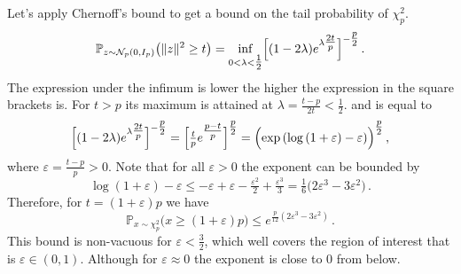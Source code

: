 \documentclass[a4paper,10pt]{article}
\begin{document}
Let's apply Chernoff's bound to get a bound on the tail probability of $\chi^2_p$.
\begin{equation*}
  \mathbb{P}_{z \sim \mathcal{N}_p(0, I_p)}\bigl( \|z\|^2 \geq t \bigr)
    = \inf_{0 < \lambda < \tfrac12} \Bigl[(1 - 2\lambda) e^{\lambda \tfrac{2 t}{p}} \Bigr]^{-\tfrac{p}2}
    \,.
\end{equation*}
The expression under the infimum is lower the higher the expression in the square
brackets is. For $t > p$ its maximum is attained at $\lambda = \tfrac{t - p}{2 t} < \tfrac12$.
and is equal to
$$
  \Bigl[(1 - 2\lambda) e^{\lambda \tfrac{2 t}{p}} \Bigr]^{-\tfrac{p}2}
    = \Bigl[\tfrac{t}{p} e^{\tfrac{p - t}{p}} \Bigr]^{\tfrac{p}2}
    = \Bigl( \exp{(\log{(1 + \varepsilon)} - \varepsilon)} \Bigr)^{\tfrac{p}2}
    \,, $$
where $\varepsilon = \tfrac{t-p}{p} > 0$. Note that for all $\varepsilon > 0$ the exponent
can be bounded by
$$
  \log{(1 + \varepsilon)} - \varepsilon
    \leq - \varepsilon + \varepsilon - \tfrac{\varepsilon^2}2 + \tfrac{\varepsilon^3}3
    = \tfrac16 \bigl( 2\varepsilon^3 - 3\varepsilon^2 \bigr)
    \,. $$
Therefore, for $t = (1 + \varepsilon) p$ we have
$$
  \mathbb{P}_{x \sim\chi^2_p} \bigl( x \geq (1 + \varepsilon) p \bigr)
    \leq e^{\tfrac{p}{12} (2 \varepsilon^3 - 3 \varepsilon^2)}
    \,. $$
This bound is non-vacuous for $\varepsilon < \tfrac32$, which well covers the region
of interest that is $\varepsilon \in (0, 1)$. Although for $\varepsilon \approx 0$
the exponent is close to $0$ from below.
\end{document}
